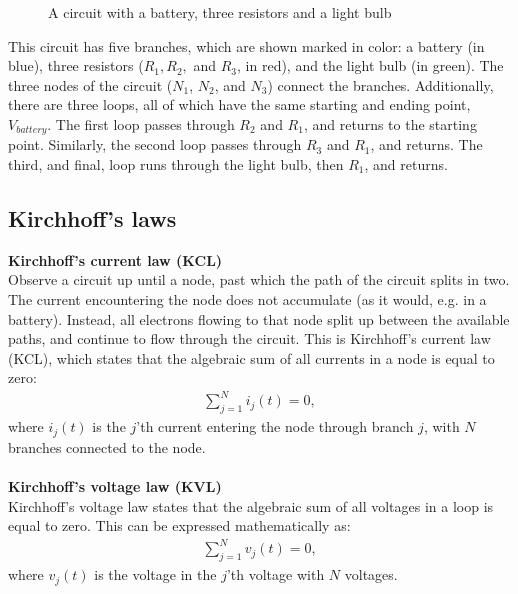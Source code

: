 \begin{figure}[H]
 
 \caption{A circuit with a battery, three resistors and a light bulb}
\end{figure}

\noindent This circuit has five branches, which are shown marked in color: a battery (in blue), three resistors ($R_1, R_2,$ and $R_3$, in red), and the light bulb (in green). The three nodes of the circuit ($N_1$, $N_2$, and $N_3$) connect the branches. Additionally, there are three loops, all of which have the same starting and ending point, $V_{battery}$. The first loop passes through $R_2$ and $R_1$, and returns to the starting point. Similarly, the second loop passes through $R_3$ and $R_1$, and returns. The third, and final, loop runs through the light bulb, then $R_1$, and returns. 

\subsection{Kirchhoff's laws}\label{Klaws}
\textbf{Kirchhoff's current law (KCL)}
\\
Observe a circuit up until a node, past which the path of the circuit splits in two. The current encountering the node does not accumulate (as it would, e.g. in a battery). Instead, all electrons flowing to that node split up between the available paths, and continue to flow through the circuit. This is Kirchhoff’s current law (KCL), which states that the algebraic sum of all currents in a node is equal to zero:
\begin{align*}
\sum_{j=1}^{N} i_{j}(t) = 0,
\end{align*}
where $i_{j}(t)$ is the $j$'th current entering the node through branch $j$, with $N$ branches connected to the node. \cite[page~32]{bcircuit}
\\
\\
\textbf{Kirchhoff's voltage law (KVL)}
\\
Kirchhoff's voltage law states that the algebraic sum of all voltages in a loop is equal to zero. This can be expressed mathematically as:
\begin{align*}
\sum_{j=1}^{N} v_{j}(t) = 0,
\end{align*}
where $v_{j}(t)$ is the voltage in the $j$'th voltage with $N$ voltages. \citep[page~34]{bcircuit}\\

